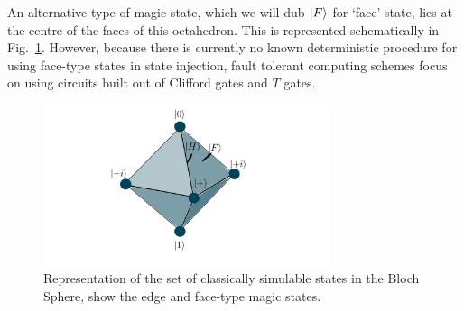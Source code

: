 \documentclass{standalone}
\begin{document}
\par
An alternative type of magic state, which we will dub $\ket{F}$ for `face'-state, lies at the centre of the faces of this octahedron. This is represented schematically in Fig.~\ref{fig:octahedron}. However, because there is currently no known deterministic procedure for using face-type states in state injection, fault tolerant computing schemes focus on using circuits built out of Clifford gates and $T$ gates.
\par
\begin{figure}[h]
    \centering
    \includegraphics[width=0.75\textwidth]{Figures/octahedron.pdf}
\caption{Representation of the set of classically simulable states in the Bloch Sphere, show the edge and face-type magic states.}
\label{fig:octahedron}
\end{figure}
\end{document}
